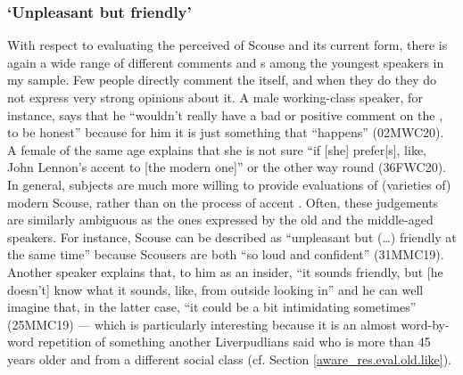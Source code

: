 \subsubsection{`Unpleasant but friendly'}
\label{aware_res.eval.young.like}

With respect to evaluating the perceived  of Scouse and its current form, there is again a wide range of different comments and s among the youngest speakers in my sample.
Few people directly comment the  itself, and when they do they do not express very strong opinions about it.
A male working-class speaker, for instance, says that he ``wouldn't really have a bad or positive comment on the , to be honest'' because for him it is just something that ``happens'' (02MWC20).
A female of the same age explains that she is not sure ``if [she] prefer[s], like, John Lennon's accent to [the modern one]'' or the other way round (36FWC20).
In general, subjects are much more willing to provide evaluations of (varieties of) modern Scouse, rather than on the process of accent .
Often, these judgements are similarly ambiguous as the ones expressed by the old and the middle-aged speakers.
For instance, Scouse can be described as ``unpleasant but (\ldots) friendly at the same time'' because Scousers are both ``so loud and confident'' (31MMC19).
Another speaker explains that, to him as an insider, ``it sounds friendly, but [he doesn't] know what it sounds, like, from outside looking in'' and he can well imagine that, in the latter case, ``it could be a bit intimidating sometimes'' (25MMC19) --- which is particularly interesting because it is an almost word-by-word repetition of something another Liverpudlians said who is more than 45 years older and from a different social class (cf. Section \ref{aware_res.eval.old.like}).

